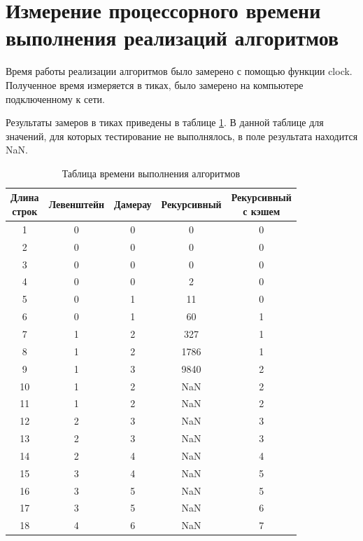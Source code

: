 \section{Измерение процессорного времени выполнения реализаций алгоритмов}

Время работы реализации алгоритмов было замерено с помощью функции clock. Полученное время измеряется в тиках, было замерено на компьютере подключенному к сети.

Результаты замеров в тиках приведены в таблице \ref{tbl:table}. В данной таблице для
значений, для которых тестирование не выполнялось, в поле результата
находится NaN.


\begin{table} [H]
	\caption{Таблица времени выполнения алгоритмов}
	\label{tbl:table}
	\begin{center}
		\begin{tabular}{|c|c|c|c|c|} 
		 	\hline
			\specialcell{Длина\\строк} & Левенштейн & Дамерау & Рекурсивный & \specialcell{Рекурсивный\\ с кэшем}\\  
		 	\hline
            1 & 0 & 0 & 0 & 0\\ \hline
            2 & 0 & 0 & 0 & 0\\ \hline
            3 & 0 & 0 & 0 & 0\\ \hline
            4 & 0 & 0 & 2 & 0\\ \hline
            5 & 0 & 1 & 11 & 0\\ \hline
            6 & 0 & 1 & 60 & 1\\ \hline
            7 & 1 & 2 & 327 & 1\\ \hline
            8 & 1 & 2 & 1786 & 1\\ \hline
            9 & 1 & 3 & 9840 & 2\\ \hline
            10 & 1 & 2 & NaN & 2\\ \hline
            11 & 1 & 2 & NaN & 2\\ \hline
            12 & 2 & 3 & NaN & 3\\ \hline
            13 & 2 & 3 & NaN & 3\\ \hline
            14 & 2 & 4 & NaN & 4\\ \hline
            15 & 3 & 4 & NaN & 5\\ \hline
            16 & 3 & 5 & NaN & 5\\ \hline
            17 & 3 & 5 & NaN & 6\\ \hline
            18 & 4 & 6 & NaN & 7\\ \hline

\end{tabular}
\end{center}
\end{table}
